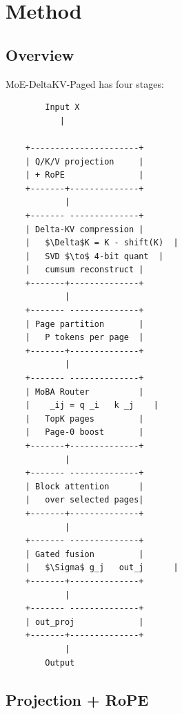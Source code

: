 \section{Method}

\subsection{Overview}

MoE-DeltaKV-Paged has four stages:

\begin{lstlisting}
        Input X
           |
            
    +----------------------+
    | Q/K/V projection     |
    | + RoPE               |
    +-------+--------------+
            |
    +------- --------------+
    | Delta-KV compression |
    |   $\Delta$K = K - shift(K)  |
    |   SVD $\to$ 4-bit quant  |
    |   cumsum reconstruct |
    +-------+--------------+
            |
    +------- --------------+
    | Page partition       |
    |   P tokens per page  |
    +-------+--------------+
            |
    +------- --------------+
    | MoBA Router          |
    |    _ij = q _i   k _j    |
    |   TopK pages         |
    |   Page-0 boost       |
    +-------+--------------+
            |
    +------- --------------+
    | Block attention      |
    |   over selected pages|
    +-------+--------------+
            |
    +------- --------------+
    | Gated fusion         |
    |   $\Sigma$ g_j   out_j      |
    +-------+--------------+
            |
    +------- --------------+
    | out_proj             |
    +-------+--------------+
            |
        Output
\end{lstlisting}

\subsection{Projection + RoPE}

